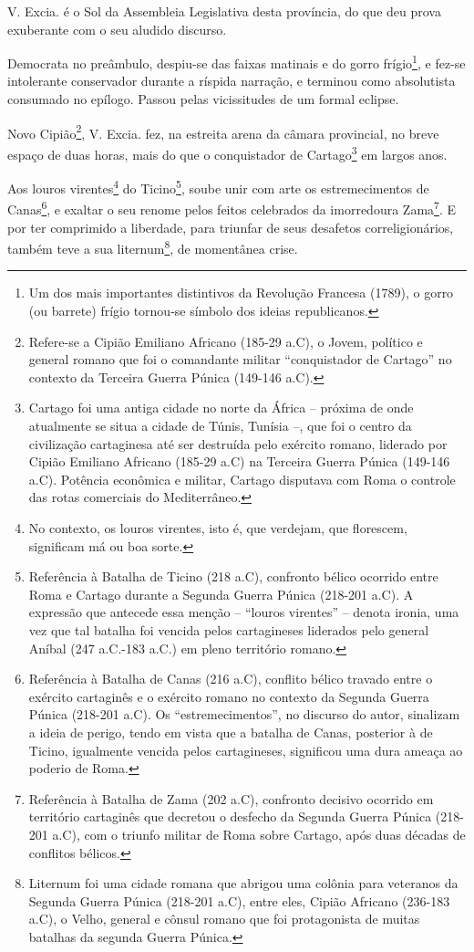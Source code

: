 V. Excia. é o Sol da Assembleia Legislativa desta província, do que deu
prova exuberante com o seu aludido discurso.

Democrata no preâmbulo, despiu-se das faixas matinais e do gorro
frígio\footnote{Um dos mais importantes distintivos da Revolução
  Francesa (1789), o gorro (ou barrete) frígio tornou-se símbolo dos
  ideias republicanos.}, e fez-se intolerante conservador durante a
ríspida narração, e terminou como absolutista consumado no epílogo.
Passou pelas vicissitudes de um formal eclipse.

Novo Cipião\footnote{Refere-se a Cipião Emiliano Africano (185-29
  a.C), o Jovem, político e general romano que foi o comandante militar
  ``conquistador de Cartago'' no contexto da Terceira Guerra Púnica
  (149-146 a.C).}, V. Excia. fez, na estreita arena da câmara
provincial, no breve espaço de duas horas, mais do que o conquistador de
Cartago\footnote{Cartago foi uma antiga cidade no norte da África --
  próxima de onde atualmente se situa a cidade de Túnis, Tunísia --, que
  foi o centro da civilização cartaginesa até ser destruída pelo
  exército romano, liderado por Cipião Emiliano Africano (185-29 a.C) na
  Terceira Guerra Púnica (149-146 a.C). Potência econômica e militar,
  Cartago disputava com Roma o controle das rotas comerciais do
  Mediterrâneo.} em largos anos.

Aos louros virentes\footnote{No contexto, os louros virentes, isto é,
  que verdejam, que florescem, significam má ou boa sorte.} do
Ticino\footnote{Referência à Batalha de Ticino (218 a.C), confronto
  bélico ocorrido entre Roma e Cartago durante a Segunda Guerra Púnica
  (218-201 a.C). A expressão que antecede essa menção -- ``louros
  virentes'' -- denota ironia, uma vez que tal batalha foi vencida pelos
  cartagineses liderados pelo general Aníbal (247 a.C.-183 a.C.) em
  pleno território romano.}, soube unir com arte os estremecimentos de
Canas\footnote{Referência à Batalha de Canas (216 a.C), conflito
  bélico travado entre o exército cartaginês e o exército romano no
  contexto da Segunda Guerra Púnica (218-201 a.C). Os ``estremecimentos'',
  no discurso do autor, sinalizam a ideia de perigo, tendo em vista que
  a batalha de Canas, posterior à de Ticino, igualmente vencida pelos
  cartagineses, significou uma dura ameaça ao poderio de Roma.}, e
exaltar o seu renome pelos feitos celebrados da imorredoura
Zama\footnote{Referência à Batalha de Zama (202 a.C), confronto
  decisivo ocorrido em território cartaginês que decretou o desfecho da
  Segunda Guerra Púnica (218-201 a.C), com o triunfo militar de Roma
  sobre Cartago, após duas décadas de conflitos bélicos.}. E por ter
comprimido a liberdade, para triunfar de seus desafetos
correligionários, também teve a sua liternum\footnote{Liternum foi uma
  cidade romana que abrigou uma colônia para veteranos da Segunda Guerra
  Púnica (218-201 a.C), entre eles, Cipião Africano (236-183 a.C), o
  Velho, general e cônsul romano que foi protagonista de muitas batalhas
  da segunda Guerra Púnica.}, de momentânea crise.

